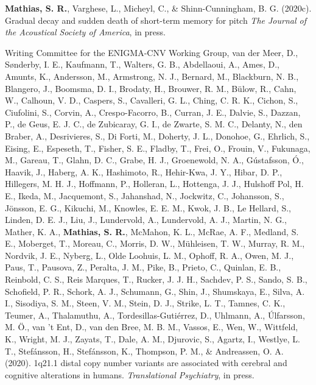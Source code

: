 \documentclass[10pt]{article}
\makeatletter
\newlength{\bibhang}
\newlength{\bibsep}
 {\@listi \global\bibsep\itemsep \global\advance\bibsep by\parsep}
\newenvironment{bibsection}%
        {\vspace{-\baselineskip}\begin{list}{}{%
       \setlength{\leftmargin}{\bibhang}%
       \setlength{\itemindent}{-\leftmargin}%
       \setlength{\itemsep}{\bibsep}%
       \setlength{\parsep}{\z@}%
        \setlength{\partopsep}{0pt}%
        \setlength{\topsep}{0pt}}}
        {\end{list}\vspace{-.6\baselineskip}}
\renewcommand{\section}[2]%
        {\pagebreak[2]\vspace{1.3\baselineskip}%
         \phantomsection\addcontentsline{toc}{section}{#1}%
         \hspace{0in}%
         \marginpar{
         \raggedright \scshape #1}#2}
\makeatother
\begin{document}
\section{Publications}
\begin{bibsection}

\item \textbf{Mathias, S. R.}, Varghese, L.,  Micheyl, C., \& Shinn-Cunningham, B. G. (2020c). Gradual decay and sudden death of short-term memory for pitch \emph{The Journal of the Acoustical Society of America}, in press.

\item Writing Committee for the ENIGMA-CNV Working Group, van der Meer, D., Sønderby, I. E., Kaufmann, T., Walters, G. B., Abdellaoui, A., Ames, D., Amunts, K., Andersson, M., Armstrong, N. J., Bernard, M., Blackburn, N. B., Blangero, J., Boomsma, D. I., Brodaty, H., Brouwer, R. M., Bülow, R., Cahn, W., Calhoun, V. D., Caspers, S., Cavalleri, G. L., Ching, C. R. K., Cichon, S., Ciufolini, S., Corvin, A., Crespo-Facorro, B., Curran, J. E., Dalvie, S., Dazzan, P., de Geus, E. J. C., de Zubicaray, G. I., de Zwarte, S. M. C., Delanty, N., den Braber, A., Desrivieres, S., Di Forti, M., Doherty, J. L., Donohoe, G., Ehrlich, S., Eising, E., Espeseth, T., Fisher, S. E., Fladby, T., Frei, O., Frouin, V., Fukunaga, M., Gareau, T., Glahn, D. C., Grabe, H. J., Groenewold, N. A., Gústafsson, Ó., Haavik, J., Haberg, A. K., Hashimoto, R., Hehir-Kwa, J. Y., Hibar, D. P., Hillegers, M. H. J., Hoffmann, P., Holleran, L., Hottenga, J. J., Hulshoff Pol, H. E., Ikeda, M., Jacquemont, S., Jahanshad, N., Jockwitz, C., Johansson, S., Jönsson, E. G., Kikuchi, M., Knowles, E. E. M., Kwok, J. B., Le Hellard, S., Linden, D. E. J., Liu, J., Lundervold, A., Lundervold, A. J., Martin, N. G., Mather, K. A., \textbf{Mathias, S. R.}, McMahon, K. L., McRae, A. F., Medland, S. E., Moberget, T., Moreau, C., Morris, D. W., Mühleisen, T. W., Murray, R. M., Nordvik, J. E., Nyberg, L., Olde Loohuis, L. M., Ophoff, R. A., Owen, M. J., Paus, T., Pausova, Z., Peralta, J. M., Pike, B., Prieto, C., Quinlan, E. B., Reinbold, C. S., Reis Marques, T., Rucker, J. J. H., Sachdev, P. S., Sando, S. B., Schofield, P. R., Schork, A. J., Schumann, G., Shin, J., Shumskaya, E., Silva, A. I., Sisodiya, S. M., Steen, V. M., Stein, D. J., Strike, L. T., Tamnes, C. K., Teumer, A., Thalamuthu, A., Tordesillas-Gutiérrez, D., Uhlmann, A., Úlfarsson, M. Ö., van 't Ent, D., van den Bree, M. B. M., Vassos, E., Wen, W., Wittfeld, K., Wright, M. J., Zayats, T., Dale, A. M., Djurovic, S., Agartz, I., Westlye, L. T., Stefánsson, H., Stefánsson, K., Thompson, P. M., \& Andreassen, O. A. (2020). 1q21.1 distal copy number variants are associated with cerebral and cognitive alterations in humans. \emph{Translational Psychiatry}, in press.


\end{bibsection}
\end{document}
